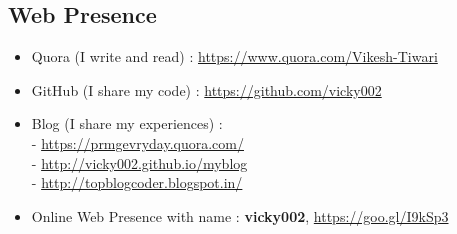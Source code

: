 \documentclass[margin,line]{res}
\begin{document}
\begin{resume}
\section{Web Presence}
\begin{itemize} \itemsep -4pt
 \item Quora (I write and read) : \url{https://www.quora.com/Vikesh-Tiwari}\\
 \item GitHub (I share my code) : \url{https://github.com/vicky002}\\
 \item Blog (I share my experiences) : \\ 
 - \url{https://prmgevryday.quora.com/}\\
 - \url{http://vicky002.github.io/myblog}\\
 - \url{http://topblogcoder.blogspot.in/}\\
 \item Online Web Presence with name : \textbf{vicky002}, \url{https://goo.gl/I9kSp3}\\
\end{itemize}







\end{resume}
\end{document}
